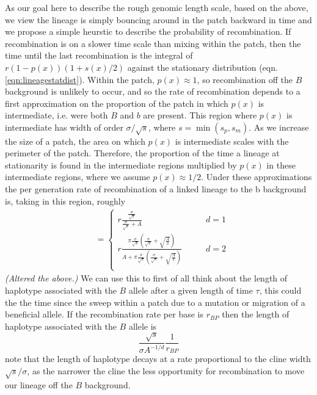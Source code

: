 \documentclass{article}
\newcommand{\gc}[1]{{\it\color{green}(#1)} }
\begin{document}
As our goal here to describe the rough genomic length scale, 
based on the above, we view 
the lineage is simply bouncing around in the patch backward in time and we propose a
simple heurstic to describe the probability of recombination. 
If recombination is on a slower time scale than mixing within the patch,
then the time until the last recombination is the integral of $r (1-p(x)) (1+s(x)/2)$ 
against the stationary distribution (eqn. \ref{eqn:lineagestatdist}).
Within the patch, $p(x) \approx 1$,
so recombination off the $B$ background is unlikely to occur,
and so the rate of recombination depends to a first approximation 
on the proportion of the patch in which $p(x)$ is intermediate,
i.e. were both $B$ and $b$ are present.
This region where $p(x)$ is intermediate has width of order $\sigma/\sqrt{s}$, where $s = \min(s_p,s_m)$.
As we increase the size of a patch, the area on which $p(x)$ is intermediate scales with the perimeter of the patch.
Therefore, the proportion of the time a lineage at stationarity is found in the intermediate regions
multiplied by $p(x)$ in these intermediate regions, where we assume
$p(x) \approx 1/2$. Under these approximations the per generation rate of
recombination of a linked lineage to the b background is, taking in this region, roughly 
\begin{align}
&=
    \begin{cases}
    r \frac{\frac{\sigma}{\sqrt{s}} }{\frac{\sigma}{\sqrt{s}} + A }    \qquad & d=1 \\
   r \frac{\pi  \frac{\sigma}{\sqrt{s}} \left( \frac{\sigma}{\sqrt{s}} +
  \sqrt{\frac{A}{\pi}} \right)}{A+\pi  \frac{\sigma}{\sqrt{s}} \left( \frac{\sigma}{\sqrt{s}} +
  \sqrt{\frac{A}{\pi}} \right) }    \qquad & d=2 \\  
\end{cases}
\label{eqn:rate-rec-in-patch}   %
\end{align}
\gc{Altered the above.}
We can use this to first of all think about the length of haplotype
associated with the $B$ allele after a given length of time $\tau$,
this could the the time since the sweep within a patch due to a
mutation or migration of a beneficial allele. If the recombination
rate per base is $r_{BP}$ then the length of haplotype associated with
the $B$ allele is
\begin{equation}
\frac{\sqrt{s}}{\sigma A^{-1/d}}\frac{1}{r_{BP}}
\end{equation} 
note that the length of haplotype decays at a rate proportional to the
cline width $\sqrt{s} / \sigma$, as the narrower the cline the less
opportunity for recombination to move our lineage off the $B$
background. 
 
\end{document}
